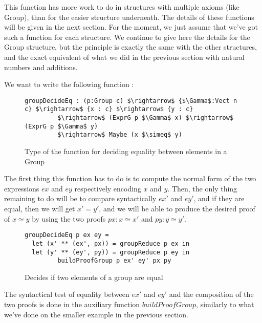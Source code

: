 This function has more work to do in structures with multiple axioms (like Group), than for the easier structure underneath.
The details of these functions will be given in the next section. For the moment, we just assume that we've got such a function for each structure. We continue to give here the details for the Group structure, but the principle is exactly the same with the other structures, and the exact equivalent of what we did in the previous section with natural numbers and additions.

We want to write the following function :

\begin{figure}[H]
\figrule
\begin{center}
\begin{lstlisting}
groupDecideEq : (p:Group c) $\rightarrow$ {$\Gamma$:Vect n c} $\rightarrow$ {x : c} $\rightarrow$ {y : c} 
	     $\rightarrow$ (ExprG p $\Gamma$ x) $\rightarrow$ (ExprG p $\Gamma$ y) 
	     $\rightarrow$ Maybe (x $\simeq$ y)
\end{lstlisting}
\end{center}
\caption{Type of the function for deciding equality between elements in a Group}
\label{groupDecideEqType}
\figrule
\end{figure}

The first thing this function has to do is to compute the normal form of the two expressions $ex$ and $ey$ respectively encoding $x$ and $y$.
Then, the only thing remaining to do will be to compare syntactically $ex'$ and $ey'$, and if they are equal, then we will get $x'=y'$, and we will be able to produce the desired proof of $x \simeq y$ by using the two proofs $px : x \simeq x'$ and $py : y \simeq y'$. 

\begin{figure}[H]
\figrule
\begin{center}
\begin{lstlisting}
groupDecideEq p ex ey =
  let (x' ** (ex', px)) = groupReduce p ex in
  let (y' ** (ey', py)) = groupReduce p ey in
	     buildProofGroup p ex' ey' px py
\end{lstlisting}
\end{center}
\caption{Decides if two elements of a group are equal}
\label{groupDecideEq}
\figrule
\end{figure}

The syntactical test of equality between $ex'$ and $ey'$ and the composition of the two proofs is done in the auxiliary function $buildProofGroup$, similarly to what we've done on the smaller example in the previous section. 

